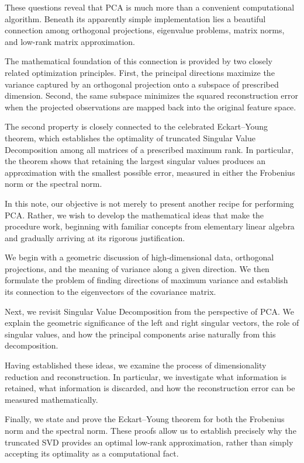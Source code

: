 \documentclass[11pt]{article}
\begin{document}
These questions reveal that PCA is much more than
a convenient computational algorithm. Beneath its
apparently simple implementation lies a beautiful
connection among orthogonal projections, eigenvalue
problems, matrix norms, and low-rank matrix
approximation.

The mathematical foundation of this connection is
provided by two closely related optimization
principles. First, the principal directions maximize
the variance captured by an orthogonal projection
onto a subspace of prescribed dimension. Second,
the same subspace minimizes the squared reconstruction
error when the projected observations are mapped
back into the original feature space.

The second property is closely connected to the
celebrated Eckart--Young theorem, which establishes
the optimality of truncated Singular Value
Decomposition among all matrices of a prescribed
maximum rank. In particular, the theorem shows
that retaining the largest singular values produces
an approximation with the smallest possible error,
measured in either the Frobenius norm or the
spectral norm.

In this note, our objective is not merely to
present another recipe for performing PCA. Rather,
we wish to develop the mathematical ideas that
make the procedure work, beginning with familiar
concepts from elementary linear algebra and
gradually arriving at its rigorous justification.

We begin with a geometric discussion of
high-dimensional data, orthogonal projections,
and the meaning of variance along a given direction.
We then formulate the problem of finding directions
of maximum variance and establish its connection
to the eigenvectors of the covariance matrix.

Next, we revisit Singular Value Decomposition
from the perspective of PCA. We explain the
geometric significance of the left and right
singular vectors, the role of singular values,
and how the principal components arise naturally
from this decomposition.

Having established these ideas, we examine the
process of dimensionality reduction and
reconstruction. In particular, we investigate
what information is retained, what information
is discarded, and how the reconstruction error
can be measured mathematically.

Finally, we state and prove the Eckart--Young
theorem for both the Frobenius norm and the
spectral norm. These proofs allow us to
establish precisely why the truncated SVD
provides an optimal low-rank approximation,
rather than simply accepting its optimality
as a computational fact.
\end{document}
